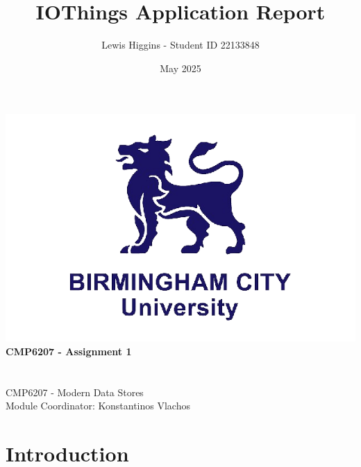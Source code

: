 \documentclass[12pt]{report}
\title{IOThings Application Report}
\author{Lewis Higgins - Student ID 22133848}
\date{May 2025}
\begin{document}
\makeatletter
\begin{titlepage}
    \begin{center}
        \includegraphics[width=0.7\linewidth]{BCU}\\[4ex]
        {\huge \bfseries CMP6207 - Assignment 1}\\[2ex]
        {\large \bfseries  \@title}\\[50ex]
        {\@author}\\[2ex]
        {CMP6207 - Modern Data Stores}\\[2ex]
        {Module Coordinator: Konstantinos Vlachos}\\[5ex]
    \end{center}
\end{titlepage}
\makeatother
\thispagestyle{empty}
\newpage


\setcounter{page}{0}

\tableofcontents
\thispagestyle{empty}

\chapter*{Introduction}












\end{document}
